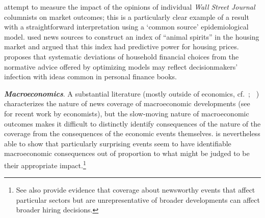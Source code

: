 \href{https://www.researchgate.net/publication/227465410_Journalists_and_the_Stock_Market}{\cite{dougal2012journalists}} attempt to measure the impact of the opinions of individual \textit{Wall Street Journal} columnists on market outcomes; this is a particularly clear example of a result with a straightforward interpretation using a `common source' epidemiological model. %
\href{https://www.stern.nyu.edu/sites/default/files/assets/documents/con_040497.pdf}{\cite{soo_quantifying_2015}} used news sources to construct an index of ``animal spirits'' in the housing market and argued that this index had predictive power for housing prices.  \cite{choi2022popular} proposes that systematic deviations of household financial choices from the normative advice offered by optimizing models may reflect decisionmakers' infection with ideas common in personal finance books.%

\textbf{\textit{Macroeconomics}}. A substantial literature (mostly outside of economics, cf.~\cite{soroka2015s}; ~\cite{damstra2021economy}) characterizes the nature of news coverage of macroeconomic developments (see  \cite{bybee2020structure} for recent work by economists), but the slow-moving nature of macroeconomic outcomes makes it difficult to distinctly identify consequences of the nature of the coverage from the consequences of the economic events themselves.  \cite{nimark2014man} is nevertheless able to show that particularly surprising events seem to have identifiable macroeconomic consequences out of proportion to what might be judged to be their appropriate impact.\footnote{See also \cite{chahrour2021sectoral} provide evidence that coverage about newsworthy events that affect particular sectors but are unrepresentative of broader developments can affect broader hiring decisions.}

